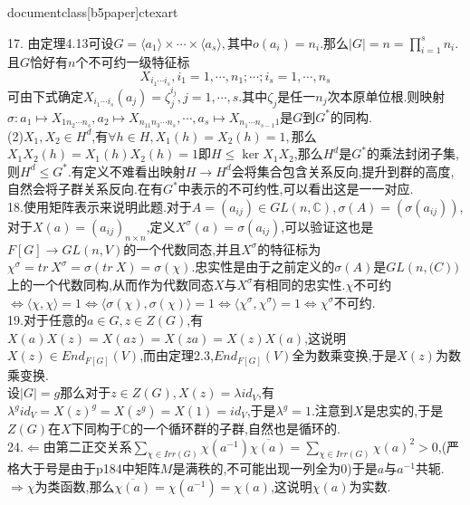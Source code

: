 documentclass[b5paper]{ctexart}
\newcommand{\ts}[2]{#1\otimes #2} 
\newcommand{\tss}[3]{#1\otimes_{#2} #3} 
\newcommand{\es}[5]{$#1\xrightarrow{#2}#3\xrightarrow{#4}#5\xrightarrow{}0$} 
\newcommand{\ess}[5]{$0\xrightarrow{}#1\xrightarrow{#2}#3\xrightarrow{#4}#5\xrightarrow{}0$}
\RequirePackage{amsmath,amsthm,amsfonts,amssymb,bm,mathrsfs,wasysym}
\RequirePackage{fancyhdr}
\usepackage{tikz}
\usepackage{wrapfig}
\newsavebox{\mygraphic}
\sbox{\mygraphic}{\texttt{[image: 1.ps]}}
\RequirePackage[top=2cm,bottom=2cm,left=0.7cm,right=0.7cm]{geometry}
\renewcommand{\baselinestretch}{1.5}

\pagestyle{plain}
\noindent
{}
17. 由定理4.13可设$G=\langle a_1\rangle \times \cdots \times\langle a_s\rangle,$其中$o(a_i)=n_i$.那么$|G|=n=\prod\limits_{i=1}^sn_i$.且$G$恰好有$n$个不可约一级特征标
\[X_{i_1\cdots i_s},i_1=1,\cdots,n_1;\cdots;i_s=1,\cdots,n_s\]
可由下式确定$X_{i_1\cdots i_s}(a_j)=\zeta_j^{i_j},j=1,\cdots,s$.其中$\zeta_j$是任一$n_j$次本原单位根.则映射$\sigma:a_1\mapsto X_{1n_2\cdots n_s},a_2\mapsto X_{n_11n_3\cdots n_s},\cdots,a_s\mapsto X_{n_1\cdots n_{s-1}1}$是$G$到$G^*$的同构.\\
(2)$X_1,X_2\in H^d$,有$\forall h\in H,X_1(h)=X_2(h)=1,$那么$X_1X_2(h)=X_1(h)X_2(h)=1$即$H\leq \ker X_1X_2$,那么$H^d$是$G^*$的乘法封闭子集,则$H^d\leq G^*$.有定义不难看出映射$H\to H^d$会将集合包含关系反向,提升到群的高度,自然会将子群关系反向.在有$G^*$中表示的不可约性,可以看出这是一一对应.\\
18.使用矩阵表示来说明此题.对于$A=(a_{ij})\in GL(n,\mathbb{C
}),\sigma(A)=(\sigma(a_{ij}))$,对于$X(a)=(a_{ij})_{n\times n}$,定义$X^{\sigma}(a)=\sigma(a_{ij})$,可以验证这也是$F[G]\to GL(n,V)$的一个代数同态,并且$X^{\sigma}$的特征标为$\chi^{\sigma}=tr~X^{\sigma}=\sigma(tr~X)=\sigma(\chi)$.忠实性是由于之前定义的$\sigma(A)$是$GL(n,\mathbb(C))$上的一个代数同构,从而作为代数同态$X$与$X^{\sigma}$有相同的忠实性.$\chi$不可约$\Leftrightarrow \langle \chi ,\chi\rangle=1\Leftrightarrow \langle \sigma(\chi) ,\sigma(\chi)\rangle=1\Leftrightarrow \langle \chi^\sigma ,\chi^\sigma\rangle=1$$\Leftrightarrow\chi^{\sigma}$不可约.\\
19.对于任意的$a\in G,z\in Z(G)$,有$X(a)X(z)=X(az)=X(za)=X(z)X(a)$,这说明$X(z)\in End_{F[G]}(V)$,而由定理2.3,$End_{F[G]}(V)$全为数乘变换,于是$X(z)$为数乘变换.\\
设$|G|=g$那么对于$z\in Z(G),X(z)=\lambda id_V$,有$\lambda^g id_V=X(z)^g=X(z^g)=X(1)=id_V$,于是$\lambda^g=1$.注意到$X$是忠实的,于是$Z(G)$在$X$下同构于$\mathbb{C}$的一个循环群的子群,自然也是循环的.\\
24.$\Leftarrow$由第二正交关系$\sum\limits_{\chi\in Irr(G)}\chi(a^{-1})\overline{\chi(a)}=\sum\limits_{\chi\in Irr(G)}\chi(a)^2>0$,(严格大于号是由于p184中矩阵$M$是满秩的,不可能出现一列全为0)于是$a$与$a^{-1}$共轭.\\
$\Rightarrow$$\chi$为类函数,那么$\overline{\chi(a)}=\chi(a^{-1})=\chi(a)$,这说明$\chi(a)$为实数.\\
